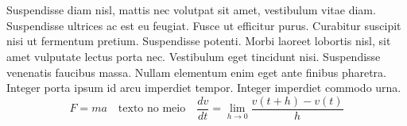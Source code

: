 \section*{}

Suspendisse diam nisl, mattis nec volutpat sit amet, vestibulum vitae diam. Suspendisse ultrices ac est eu feugiat. Fusce ut efficitur purus. Curabitur suscipit nisi ut fermentum pretium. Suspendisse potenti. Morbi laoreet lobortis nisl, sit amet vulputate lectus porta nec. Vestibulum eget tincidunt nisi. Suspendisse venenatis faucibus massa. Nullam elementum enim eget ante finibus pharetra. Integer porta ipsum id arcu imperdiet tempor. Integer imperdiet commodo urna.
 \begin{equation}
     F = ma \quad\text{texto no meio}\quad \frac{dv}{dt}= \lim_{h\to0} \frac{v(t+h)-v(t)}{h}
 \end{equation}

